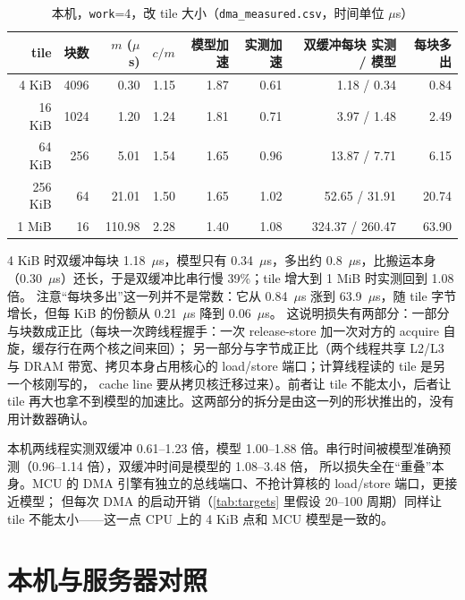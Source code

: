 \documentclass[11pt,a4paper]{ctexart}
\begin{document}
\begin{table}[H]
\centering\small
\caption{本机，\texttt{work}=4，改 tile 大小（\texttt{dma\_measured.csv}，时间单位 $\mu$s）}\label{tab:localtiles}
\begin{tabular}{rrrrrrrr}
\toprule
tile & 块数 & $m$ ($\mu$s) & $c/m$ & 模型加速 & 实测加速 & 双缓冲每块 实测 / 模型 & 每块多出 \\
\midrule
4 KiB & 4096 & 0.30 & 1.15 & 1.87 & 0.61 & 1.18 / 0.34 & 0.84 \\
16 KiB & 1024 & 1.20 & 1.24 & 1.81 & 0.71 & 3.97 / 1.48 & 2.49 \\
64 KiB & 256 & 5.01 & 1.54 & 1.65 & 0.96 & 13.87 / 7.71 & 6.15 \\
256 KiB & 64 & 21.01 & 1.50 & 1.65 & 1.02 & 52.65 / 31.91 & 20.74 \\
1 MiB & 16 & 110.98 & 2.28 & 1.40 & 1.08 & 324.37 / 260.47 & 63.90 \\
\bottomrule
\end{tabular}
\end{table}

4 KiB 时双缓冲每块 1.18~$\mu$s，模型只有 0.34~$\mu$s，多出约 0.8~$\mu$s，比搬运本身（0.30~$\mu$s）还长，于是双缓冲比串行慢 39\%；tile 增大到 1 MiB 时实测回到 1.08 倍。
注意“每块多出”这一列并不是常数：它从 0.84~$\mu$s 涨到 63.9~$\mu$s，随 tile 字节增长，但每 KiB 的份额从 0.21~$\mu$s 降到 0.06~$\mu$s。
这说明损失有两部分：一部分与块数成正比（每块一次跨线程握手：一次 release-store 加一次对方的 acquire 自旋，缓存行在两个核之间来回）；
另一部分与字节成正比（两个线程共享 L2/L3 与 DRAM 带宽、拷贝本身占用核心的 load/store 端口；计算线程读的 tile 是另一个核刚写的，
cache line 要从拷贝核迁移过来）。前者让 tile 不能太小，后者让 tile 再大也拿不到模型的加速比。这两部分的拆分是由这一列的形状推出的，没有用计数器确认。

\begin{findingbox}
本机两线程实测双缓冲 0.61--1.23 倍，模型 1.00--1.88 倍。串行时间被模型准确预测（0.96--1.14 倍），双缓冲时间是模型的 1.08--3.48 倍，
所以损失全在“重叠”本身。MCU 的 DMA 引擎有独立的总线端口、不抢计算核的 load/store 端口，更接近模型；
但每次 DMA 的启动开销（\cref{tab:targets} 里假设 20--100 周期）同样让 tile 不能太小——这一点 CPU 上的 4 KiB 点和 MCU 模型是一致的。
\end{findingbox}

\section{本机与服务器对照}\label{sec:cross}
\end{document}
